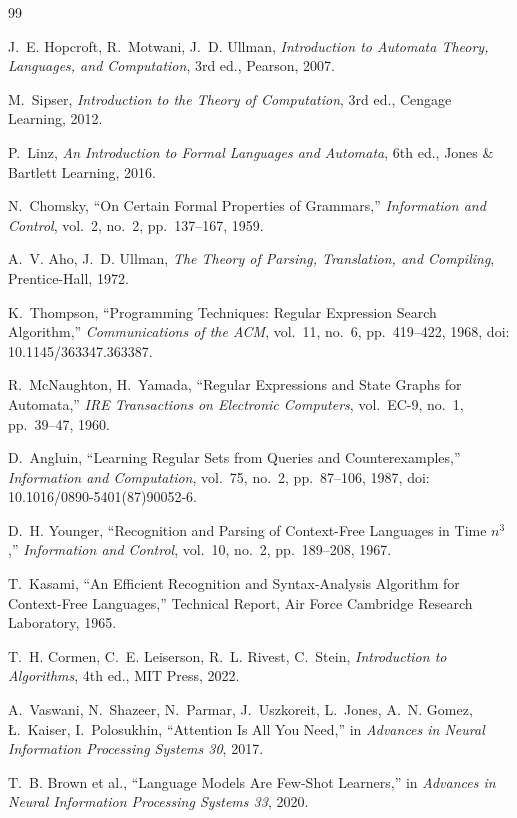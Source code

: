 \documentclass[12pt]{article}
\begin{document}
\begin{thebibliography}{99}

J.~E. Hopcroft, R.~Motwani, J.~D. Ullman,
\textit{Introduction to Automata Theory, Languages, and Computation},
3rd ed., Pearson, 2007.

M.~Sipser,
\textit{Introduction to the Theory of Computation},
3rd ed., Cengage Learning, 2012.

P.~Linz,
\textit{An Introduction to Formal Languages and Automata},
6th ed., Jones \& Bartlett Learning, 2016.

N.~Chomsky,
``On Certain Formal Properties of Grammars,''
\textit{Information and Control},
vol.~2, no.~2, pp.~137--167, 1959.

A.~V. Aho, J.~D. Ullman,
\textit{The Theory of Parsing, Translation, and Compiling},
Prentice-Hall, 1972.

K.~Thompson,
``Programming Techniques: Regular Expression Search Algorithm,''
\textit{Communications of the ACM},
vol.~11, no.~6, pp.~419--422, 1968,
doi: 10.1145/363347.363387.

R.~McNaughton, H.~Yamada,
``Regular Expressions and State Graphs for Automata,''
\textit{IRE Transactions on Electronic Computers},
vol.~EC-9, no.~1, pp.~39--47, 1960.

D.~Angluin,
``Learning Regular Sets from Queries and Counterexamples,''
\textit{Information and Computation},
vol.~75, no.~2, pp.~87--106, 1987,
doi: 10.1016/0890-5401(87)90052-6.

D.~H. Younger,
``Recognition and Parsing of Context-Free Languages in Time $n^3$,''
\textit{Information and Control},
vol.~10, no.~2, pp.~189--208, 1967.

T.~Kasami,
``An Efficient Recognition and Syntax-Analysis Algorithm for Context-Free Languages,''
Technical Report, Air Force Cambridge Research Laboratory, 1965.

T.~H. Cormen, C.~E. Leiserson, R.~L. Rivest, C.~Stein,
\textit{Introduction to Algorithms},
4th ed., MIT Press, 2022.

A.~Vaswani, N.~Shazeer, N.~Parmar, J.~Uszkoreit,
L.~Jones, A.~N. Gomez, Ł.~Kaiser, I.~Polosukhin,
``Attention Is All You Need,''
in \textit{Advances in Neural Information Processing Systems 30},
2017.

T.~B. Brown et al.,
``Language Models Are Few-Shot Learners,''
in \textit{Advances in Neural Information Processing Systems 33},
2020.


\end{thebibliography}
\end{document}
